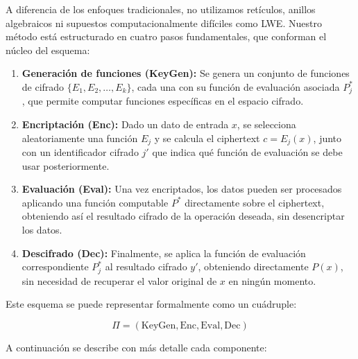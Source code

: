 \documentclass[11pt]{article}
\theoremstyle{plain}
\begin{document}
A diferencia de los enfoques tradicionales, no utilizamos retículos, anillos algebraicos ni supuestos computacionalmente difíciles como LWE. Nuestro método está estructurado en cuatro pasos fundamentales, que conforman el núcleo del esquema:

\begin{enumerate}
    \item \textbf{Generación de funciones (KeyGen):} Se genera un conjunto de funciones de cifrado \( \{E_1, E_2, \dots, E_k\} \), cada una con su función de evaluación asociada \( P^*_j \), que permite computar funciones específicas en el espacio cifrado.
    
    \item \textbf{Encriptación (Enc):} Dado un dato de entrada $x$, se selecciona aleatoriamente una función \( E_j \) y se calcula el ciphertext \( c = E_j(x) \), junto con un identificador cifrado $j'$ que indica qué función de evaluación se debe usar posteriormente.

    \item \textbf{Evaluación (Eval):} Una vez encriptados, los datos pueden ser procesados aplicando una función computable \( P^* \) directamente sobre el ciphertext, obteniendo así el resultado cifrado de la operación deseada, sin desencriptar los datos.

    \item \textbf{Descifrado (Dec):} Finalmente, se aplica la función de evaluación correspondiente \( P^*_j \) al resultado cifrado \( y' \), obteniendo directamente \( P(x) \), sin necesidad de recuperar el valor original de $x$ en ningún momento.
\end{enumerate}

Este esquema se puede representar formalmente como un cuádruple:

\[
\Pi = (\text{KeyGen}, \text{Enc}, \text{Eval}, \text{Dec})
\]

A continuación se describe con más detalle cada componente:
\end{document}

